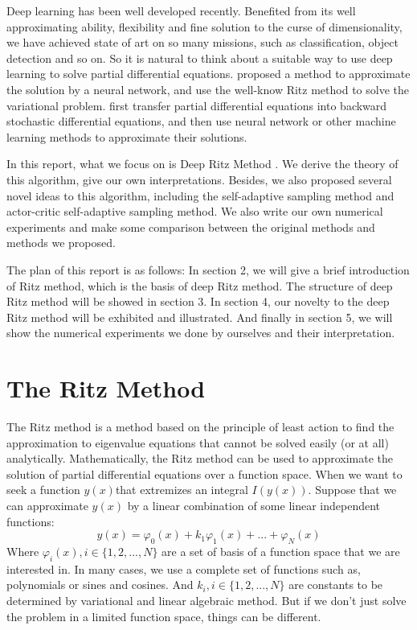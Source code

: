 \documentclass{article}
\begin{document}
\par Deep learning \cite{lecun2015deep} has been well developed recently. Benefited from its well approximating ability, flexibility and fine solution to the curse of dimensionality, we have achieved state of art on so many missions, such as classification, object detection and so on. So it is natural to think about a suitable way to use deep learning to solve partial differential equations. \cite{yu2017deep} proposed a method to approximate the solution by a neural network, and use the well-know Ritz method to solve the variational problem. \cite{1707.02568}\cite{weinan2017deep}\cite{beck2017machine} first transfer partial differential equations into backward stochastic differential equations, and then use neural network or other machine learning methods to approximate their solutions.
\par In this report, what we focus on is Deep Ritz Method \cite{yu2017deep}. We derive the theory of this algorithm, give our own interpretations. Besides, we also proposed several novel ideas to this algorithm, including the self-adaptive sampling method and actor-critic self-adaptive sampling method. We also write our own numerical experiments and make some comparison between the original methods and methods we proposed.
\par The plan of this report is as follows: In section 2, we will give a brief introduction of Ritz method, which is the basis of deep Ritz method. The structure of deep Ritz method will be showed in section 3. In section 4, our novelty to the deep Ritz method will be exhibited and illustrated. And finally in section 5, we will show the numerical experiments we done by ourselves and their interpretation.

\section{The Ritz Method}
\par The Ritz method is a method based on the principle of least action to find the approximation to eigenvalue equations that cannot be solved easily (or at all) analytically. Mathematically, the Ritz method can be used to approximate the solution of partial differential equations over a function space. When we want to seek a function $y(x)$that extremizes an integral $I(y(x))$. Suppose that we can approximate $y(x)$ by a linear combination of some linear independent  functions:
\begin{equation}
y(x)=\varphi_0(x)+k_1\varphi_1(x)+...+\varphi_N(x)
\end{equation}
Where $\varphi_{i}(x),i\in\{1,2,...,N\}$  are a set of basis of a function space that we are interested in. In many cases, we use a complete set of functions such as, polynomials or sines and cosines. And $k_i,i\in\{1,2,...,N\}$ are constants to be determined by variational and linear algebraic method. But if we don't just solve the problem in a limited function space, things can be different. 
\end{document}
